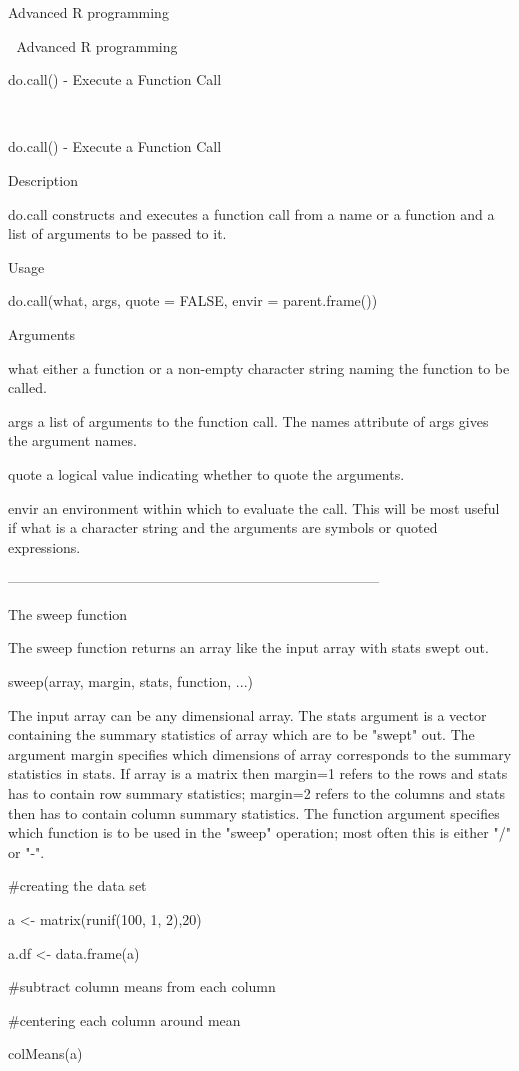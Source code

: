 


Advanced R programming


Advanced R programming

do.call()  - Execute a Function Call




do.call()  - Execute a Function Call


Description


do.call constructs and executes a function call from a name or a function and a list of arguments to be passed to it.


Usage


do.call(what, args, quote = FALSE, envir = parent.frame())


Arguments


what    either a function or a non-empty character string naming the function to be called.

args    a list of arguments to the function call. The names attribute of args gives the argument names.

quote    a logical value indicating whether to quote the arguments.

envir    an environment within which to evaluate the call. This will be most useful if what is a character string and the arguments are symbols or quoted expressions.




--------------------------------------------------------------------------------


The sweep function


The sweep function returns an array like the input array with stats swept out.


sweep(array, margin, stats, function, ...)


The input array can be any dimensional array. The stats argument is a vector containing the summary statistics of array which are to be "swept" out. The argument margin specifies which dimensions of array corresponds to the summary statistics in stats. If array is a matrix then margin=1 refers to the rows and stats has to contain row summary statistics; margin=2 refers to the columns and stats then has to contain column summary statistics. The function argument specifies which function is to be used in the "sweep" operation; most often this is either "/" or "-".









#creating the data set

a <- matrix(runif(100, 1, 2),20)

a.df <- data.frame(a)

#subtract column means from each column

#centering each column around mean

colMeans(a)
 




